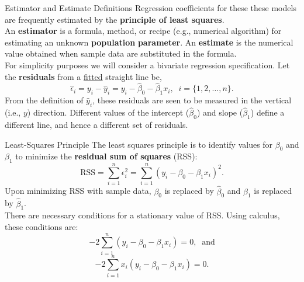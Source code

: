 \documentclass[pdf]{beamer}
\newcommand{\empr}[1]{{\color{franklinblue}\textbf{#1}}}
\theoremstyle{remark}
\theoremstyle{definition}
\begin{document}
\begin{frame}[t]{Estimator and Estimate Definitions}
Regression coefficients for these these models are frequently estimated by the \empr{principle of least squares}.   \\
\vspace{1.5ex}
An \empr{estimator} is a formula, method, or recipe (e.g., numerical algorithm) for estimating an unknown \empr{population} \empr{parameter}. An \empr{estimate} is the numerical value obtained when sample data are substituted in the formula. \\
\vspace{1.5ex}
For simplicity purposes we will consider a bivariate regression specification. Let the \empr{residuals} from a \underline{fitted} straight line be,\\
\vspace{-1.0ex}
\begin{equation}
\hat{\epsilon}_i = y_i - \hat{y}_i = y_i - \hat{\beta}_0 - \hat{\beta}_1x_i, \;\; i = \{1,2,\ldots,n\}.
\end{equation}
From the definition of $\hat{y}_i$, these residuals are seen to be measured in the vertical (i.e., $y$) direction.  Different values of the intercept ($\hat{\beta}_0$) and slope ($\hat{\beta}_1$) define a  different line, and hence a different set of residuals.
\end{frame}

\begin{frame}[t]{Least-Squares Principle}
The least squares principle is to identify values for $\beta_0$ and $\beta_1$ to minimize the \empr{residual sum of squares} (RSS): \\
\vspace{-0.5ex}
\begin{equation}
\text{RSS} = \sum_{i=1}^{n} \epsilon_{i}^{2} = \sum_{i=1}^{n}(y_i-\beta_0-\beta_1x_i)^2.
\end{equation}
Upon minimizing RSS with sample data, $\beta_0$ is replaced by $\hat{\beta}_0$ and $\beta_1$ is replaced by $\hat{\beta}_1$. \\
\vspace{1.5ex} 
There are necessary conditions for a stationary value of RSS.  Using calculus, these conditions are:
\begin{equation} \label{eq:ls1}
-2 \sum_{i=1}^n(y_i-\beta_0 - \beta_1x_i) = 0, \;\; \text{and}
\end{equation}
\begin{equation} \label{eq:ls2}
-2 \sum_{i=1}^n x_i(y_i-\beta_0 - \beta_1x_i) = 0.
\end{equation}
\end{frame}
\end{document}
